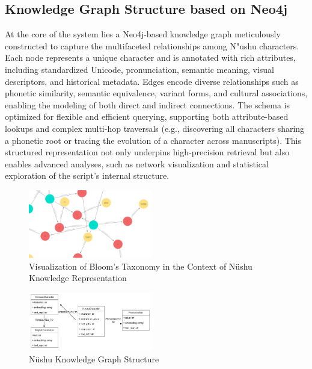 \documentclass{article}
\begin{document}
\subsection{Knowledge Graph Structure based on Neo4j}
\label{ssec:kg_structure}
    At the core of the system lies a Neo4j-based knowledge graph meticulously constructed to capture the multifaceted relationships among N"{u}shu characters. Each node represents a unique character and is annotated with rich attributes, including standardized Unicode, pronunciation, semantic meaning, visual descriptors, and historical metadata. Edges encode diverse relationships such as phonetic similarity, semantic equivalence, variant forms, and cultural associations, enabling the modeling of both direct and indirect connections. The schema is optimized for flexible and efficient querying, supporting both attribute-based lookups and complex multi-hop traversals (e.g., discovering all characters sharing a phonetic root or tracing the evolution of a character across manuscripts). This structured representation not only underpins high-precision retrieval but also enables advanced analyses, such as network visualization and statistical exploration of the script's internal structure.

    \begin{figure}[htb]
    \centering
    \includegraphics[width=0.48\textwidth]{images/bloom-visualisation.png}
    \caption{Visualization of Bloom's Taxonomy in the Context of N\"{u}shu Knowledge Representation}
    \label{fig:bloom_visualisation}
    \end{figure}

    \begin{figure}[htb]
    \centering
    \includegraphics[width=0.48\textwidth]{images/nvshu.drawio.pdf}
    \caption{N\"{u}shu Knowledge Graph Structure}
    \label{fig:nvshu_kg_structure}
    \end{figure}
\end{document}
